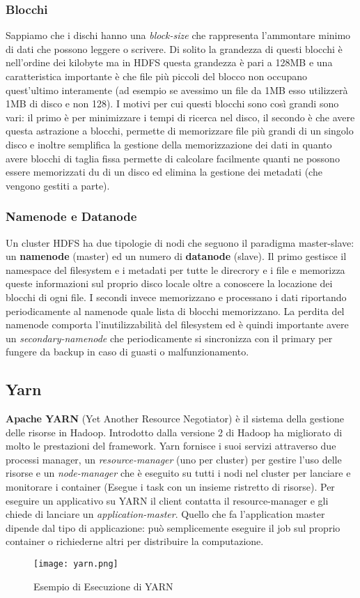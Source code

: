 \subsubsection{Blocchi}
Sappiamo che i dischi hanno una \textit{block-size} che rappresenta l'ammontare minimo di dati che possono leggere o scrivere. Di solito la grandezza di questi blocchi è nell'ordine dei kilobyte ma in HDFS questa grandezza è pari a 128MB e una caratteristica importante è che file più piccoli del blocco non occupano quest'ultimo interamente (ad esempio se avessimo un file da 1MB esso utilizzerà 1MB di disco e non 128). I motivi per cui questi blocchi sono così grandi sono vari: il primo è per minimizzare i tempi di ricerca nel disco, il secondo è che avere questa astrazione a blocchi, permette di memorizzare file più grandi di un singolo disco e inoltre semplifica la gestione della memorizzazione dei dati in quanto avere blocchi di taglia fissa permette di calcolare facilmente quanti ne possono essere memorizzati du di un disco ed elimina la gestione dei metadati (che vengono gestiti a parte).
\subsubsection{Namenode e Datanode}
Un cluster HDFS ha due tipologie di nodi che seguono il paradigma master-slave: un \textbf{namenode} (master) ed un numero di \textbf{datanode} (slave). Il primo gestisce il namespace del filesystem e i metadati per tutte le direcrory e i file e memorizza queste informazioni sul proprio disco locale oltre a conoscere la locazione dei blocchi di ogni file. I secondi invece memorizzano e processano i dati riportando periodicamente al namenode quale lista di blocchi memorizzano. La perdita del namenode comporta l'inutilizzabilità del filesystem ed è quindi importante avere un \textit{secondary-namenode} che periodicamente si sincronizza con il primary per fungere da backup in caso di guasti o malfunzionamento.
\subsection{Yarn}
\textbf{Apache YARN} (Yet Another Resource Negotiator) è il sistema della gestione delle risorse in Hadoop. Introdotto dalla versione 2 di Hadoop ha migliorato di molto le prestazioni del framework. Yarn fornisce i suoi servizi attraverso due processi manager, un \textit{resource-manager} (uno per cluster) per gestire l'uso delle risorse e un \textit{node-manager} che è eseguito su tutti i nodi nel cluster per lanciare e monitorare i container (Esegue i task con un insieme ristretto di risorse). Per eseguire un applicativo su YARN il client contatta il resource-manager e gli chiede di lanciare un \textit{application-master}. Quello che fa l'application master dipende dal tipo di applicazione: può semplicemente eseguire il job sul proprio container o richiederne altri per distribuire la computazione.
\begin{figure}
  \begin{center}
    \texttt{[image: yarn.png]}
    \caption{Esempio di Esecuzione di YARN}
    \label{fig:yarn}
  \end{center}
\end{figure}
